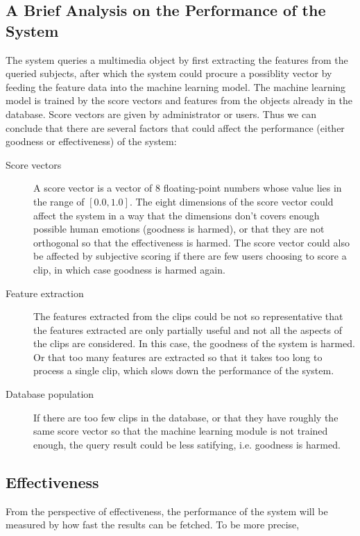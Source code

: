 \documentclass{report}
\begin{document}
\subsection{A Brief Analysis on the Performance of the System}

The system queries a multimedia object by first extracting the features from the queried subjects, after which the system could procure a possiblity vector by feeding the feature data into the machine learning model. The machine learning model is trained by the score vectors and features from the objects already in the database. Score vectors are given by administrator or users. Thus we can conclude that there are several factors that could affect the performance (either goodness or effectiveness) of the system:
\begin{description}
\item[Score vectors] A score vector is a vector of 8 floating-point numbers whose value lies in the range of $[0.0, 1.0]$. The eight dimensions of the score vector could affect the system in a way that the dimensions don't covers enough possible human emotions (goodness is harmed), or that they are not orthogonal so that the effectiveness is harmed. The score vector could also be affected by subjective scoring if there are few users choosing to score a clip, in which case goodness is harmed again.
\item[Feature extraction] The features extracted from the clips could be not so representative that the features extracted are only partially useful and not all the aspects of the clips are considered. In this case, the goodness of the system is harmed. Or that too many features are extracted so that it takes too long to process a single clip, which slows down the performance of the system.
\item[Database population] If there are too few clips in the database, or that they have roughly the same score vector so that the machine learning module is not trained enough, the query result could be less satifying, i.e. goodness is harmed.
\end{description}

\subsection{Effectiveness}

From the perspective of effectiveness, the performance of the system will be measured by how fast the results can be fetched. To be more precise,
\end{document}
